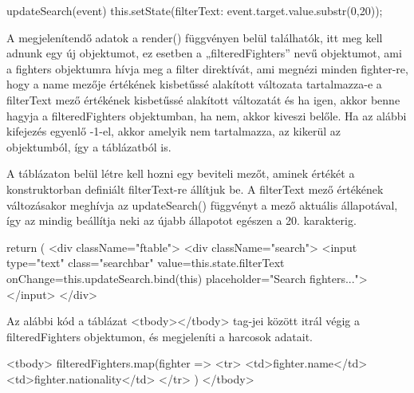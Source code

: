 \begin{cpp}
updateSearch(event){
    this.setState({filterText: event.target.value.substr(0,20)}); }
\end{cpp}

A megjelenítendő adatok a render() függvényen belül találhatók, itt meg kell adnunk egy új objektumot, ez esetben a „filteredFighters” nevű objektumot, ami a fighters objektumra hívja meg a filter direktívát, ami megnézi minden fighter-re, hogy a name mezője értékének kisbetűssé alakított változata tartalmazza-e a filterText mező értékének kisbetűssé alakított változatát és ha igen, akkor benne hagyja a filteredFighters objektumban, ha nem, akkor kiveszi belőle. Ha az alábbi kifejezés egyenlő -1-el, akkor amelyik nem tartalmazza, az kikerül az objektumból, így a táblázatból is.

\begin{cpp}
render() {
 let filteredFighters = this.state.fighters.filter(
  (fighter) => {
   return fighter.name.toLowerCase()
   .indexOf(this.state.filterText.toLowerCase()) !== -1;
 }
);
\end{cpp}

A táblázaton belül létre kell hozni egy beviteli mezőt, aminek értékét a konstruktorban definiált filterText-re állítjuk be. A filterText mező értékének változásakor meghívja az
updateSearch() függvényt a mező aktuális állapotával, így az mindig beállítja neki az újabb állapotot egészen a 20. karakterig.

\begin{cpp}
return (
  <div className="ftable">
    <div className="search">
      <input type="text" class="searchbar" value={this.state.filterText} 					   onChange={this.updateSearch.bind(this)} placeholder="Search fighters...">
      </input>
  </div>
\end{cpp}

Az alábbi kód a táblázat <tbody></tbody> tag-jei között itrál végig a filteredFighters objektumon, és megjeleníti a harcosok adatait.

\begin{cpp}
<tbody>
{filteredFighters.map(fighter =>
<tr>
	<td>{fighter.name}</td>
	<td>{fighter.nationality}</td>
</tr>
)}
</tbody>
\end{cpp}




